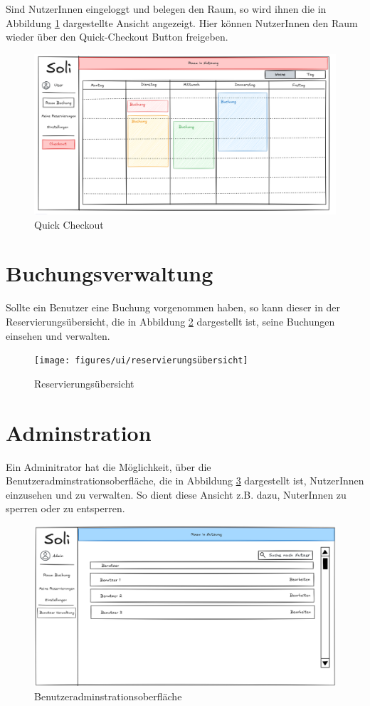 Sind NutzerInnen eingeloggt und belegen den Raum,
so wird ihnen die in Abbildung \ref{fig:checkout} dargestellte Ansicht angezeigt.
Hier können NutzerInnen den Raum wieder über den Quick-Checkout Button freigeben.
\begin{figure}[ht]
    \centering
    \includegraphics[scale=0.15]{figures/ui/checkout}
    \caption{Quick Checkout}
    \label{fig:checkout}
\end{figure}
\clearpage

\section{Buchungsverwaltung}
Sollte ein Benutzer eine Buchung vorgenommen haben, so kann dieser in der Reservierungsübersicht,
die in Abbildung \ref{fig:overview} dargestellt ist, seine Buchungen einsehen und verwalten.

\begin{figure}[ht]
    \texttt{[image: figures/ui/reservierungsübersicht]}
    \caption{Reservierungsübersicht}
    \label{fig:overview}
\end{figure}
\clearpage

\section{Adminstration}
Ein Adminitrator hat die Möglichkeit, über die Benutzeradminstrationsoberfläche,
die in Abbildung \ref{fig:adminuser} dargestellt ist, NutzerInnen einzusehen und zu verwalten.
So dient diese Ansicht z.B. dazu, NuterInnen zu sperren oder zu entsperren.

\begin{figure}[ht]
    \centering
    \includegraphics[scale=0.15]{figures/ui/useradminui}
    \caption{Benutzeradminstrationsoberfläche}
    \label{fig:adminuser}
\end{figure}

